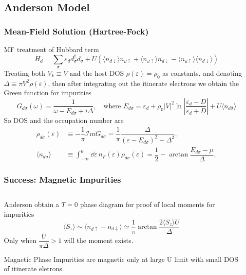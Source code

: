 \documentclass[10pt,aspectratio=43,xcolor=x11names,t]{beamer}%
\begin{document}
	\subsection{Anderson Model}
		\begin{frame}[t]\frametitle{Mean-Field Solution (Hartree-Fock)}
			MF treatment of Hubbard term
			\begin{equation*}
				H_d=\sum_{\sigma}\varepsilon_d d_\sigma^\dagger d_\sigma+U(\langle n_{d\downarrow}\rangle n_{d\uparrow}+\langle n_{d\uparrow}\rangle n_{d\downarrow}-\langle n_{d\uparrow}\rangle \langle n_{d\downarrow}\rangle )
			\end{equation*}
			\pause
			Treating both $V_k\equiv V$ and the host DOS $\rho(\varepsilon)=\rho_0$ as constants, and denoting $\Delta\equiv\pi V^2\rho(\varepsilon)$, then after integrating out the itinerate electrons we obtain the Green function for impurities
			\begin{equation*}
				G_{d\sigma}(\omega)=\dfrac{1}{\omega-E_{d\sigma}+i\Delta},\quad\text{where }E_{d\sigma}=\varepsilon_d+\rho_0 |V|^2\ln\left|\dfrac{\varepsilon_d-D}{\varepsilon_d+D}\right|+U \langle n_{d\bar\sigma} \rangle
			\end{equation*}
			So DOS and the occupation number are
			\begin{align*}
				\rho_{d\sigma}(\varepsilon)&\equiv-\dfrac{1}{\pi}\mathcal{I}m G_{d\sigma}=\dfrac{1}{\pi}\dfrac{\Delta}{(\varepsilon-E_{d\sigma})^2+\Delta^2},\\
				\langle n_{d\sigma}\rangle &\equiv\int_{-\infty}^\mu\dd \varepsilon\, n_F(\varepsilon)\rho_{d\sigma}(\varepsilon)=\dfrac{1}{2}-\arctan\dfrac{E_{d\sigma}-\mu}{\Delta},
			\end{align*}
		\end{frame}
		\begin{frame}[t]\frametitle{Success: Magnetic Impurities}
			\begin{columns}
				\begin{column}{0.4\textwidth}
					Anderson obtain a $T=0$ phase diagram for proof of local moments for impurities
					\begin{equation*}
						\langle S_z \rangle \sim \langle n_{d\uparrow}-n_{d\downarrow} \rangle\simeq\dfrac{1}{\pi}\arctan\dfrac{2\langle S_z \rangle U}{\Delta}
					\end{equation*}
					Only when $\dfrac{U}{\pi\Delta}>1$ will the moment exists.
					\pause
					\begin{redblock}{Magnetic Phase}
						Impurities are magnetic only {\color{blue}at large U limit} with small DOS of itinerate eletrons.
					\end{redblock}
				\end{column}
				\begin{column}{0.4\textwidth}

				\end{column}
			\end{columns}
		\end{frame}
\end{document}
